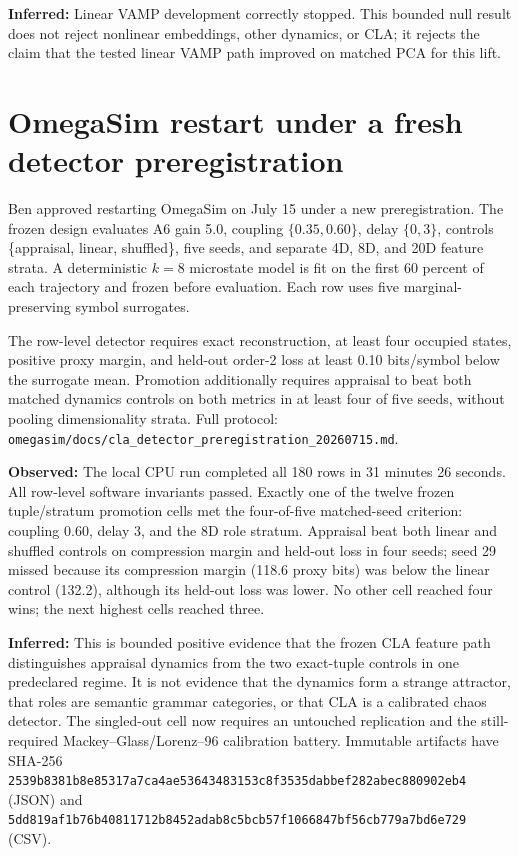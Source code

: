 \documentclass[11pt]{article}
\newcommand{\observed}{\textbf{Observed:}}
\newcommand{\inferred}{\textbf{Inferred:}}
\begin{document}
\inferred{} Linear VAMP development correctly stopped. This bounded null result
does not reject nonlinear embeddings, other dynamics, or CLA; it rejects the
claim that the tested linear VAMP path improved on matched PCA for this lift.

\section{OmegaSim restart under a fresh detector preregistration}

Ben approved restarting OmegaSim on July 15 under a new preregistration. The
frozen design evaluates A6 gain 5.0, coupling $\{0.35,0.60\}$, delay $\{0,3\}$,
controls \{appraisal, linear, shuffled\}, five seeds, and separate 4D, 8D, and
20D feature strata. A deterministic $k=8$ microstate model is fit on the first
60 percent of each trajectory and frozen before evaluation. Each row uses five
marginal-preserving symbol surrogates.

The row-level detector requires exact reconstruction, at least four occupied
states, positive proxy margin, and held-out order-2 loss at least 0.10
bits/symbol below the surrogate mean. Promotion additionally requires appraisal
to beat both matched dynamics controls on both metrics in at least four of five
seeds, without pooling dimensionality strata. Full protocol:
\texttt{omegasim/docs/cla\_detector\_preregistration\_20260715.md}.

\observed{} The local CPU run completed all 180 rows in 31 minutes 26 seconds.
All row-level software invariants passed. Exactly one of the twelve frozen
tuple/stratum promotion cells met the four-of-five matched-seed criterion:
coupling 0.60, delay 3, and the 8D role stratum. Appraisal beat both linear and
shuffled controls on compression margin and held-out loss in four seeds; seed
29 missed because its compression margin (118.6 proxy bits) was below the
linear control (132.2), although its held-out loss was lower. No other cell
reached four wins; the next highest cells reached three.

\inferred{} This is bounded positive evidence that the frozen CLA feature path
distinguishes appraisal dynamics from the two exact-tuple controls in one
predeclared regime. It is not evidence that the dynamics form a strange
attractor, that roles are semantic grammar categories, or that CLA is a
calibrated chaos detector. The singled-out cell now requires an untouched
replication and the still-required Mackey--Glass/Lorenz--96 calibration battery.
Immutable artifacts have SHA-256
\texttt{2539b8381b8e85317a7ca4ae53643483153c8f3535dabbef282abec880902eb4}
(JSON) and
\texttt{5dd819af1b76b40811712b8452adab8c5bcb57f1066847bf56cb779a7bd6e729}
(CSV).
\end{document}
